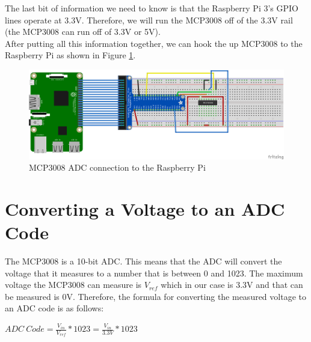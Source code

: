 \documentclass{article}
\begin{document}
The last bit of information we need to know is that the Raspberry Pi 3's GPIO lines operate at 3.3V. Therefore, we will run the MCP3008 off of the 3.3V rail (the MCP3008 can run off of 3.3V or 5V). \\

After putting all this information together, we can hook the up MCP3008 to the Raspberry Pi as shown in Figure \ref{ADC_3_3_Breadboard}.

	\begin{figure}[H]
		\centering
		\includegraphics[width=1\textwidth]{pics/MCP3008_Breadboard_Hookup.png}
		\caption{MCP3008 ADC connection to the Raspberry Pi}
		\label{ADC_3_3_Breadboard}
	\end{figure}



\section{Converting a Voltage to an ADC Code}
The MCP3008 is a 10-bit ADC. This means that the ADC will convert the voltage that it measures to a number that is between 0 and 1023. The maximum voltage the MCP3008 can measure is $V_{ref}$ which in our case is 3.3V and that can be measured is 0V. Therefore, the formula for converting the measured voltage to an ADC code is as follows:

\begin{center}
	\begin{math}
	ADC\ Code = \frac{V_{in}}{V_{ref}} * 1023 = \frac{V_{in}}{3.3V} * 1023
	\end{math}
\end{center}



\end{document}
